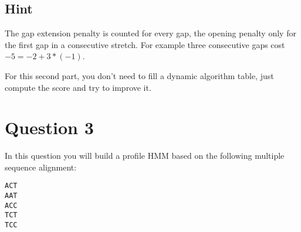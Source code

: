 \documentclass[a4paper,11pt]{article}
\begin{document}
\subsection*{Hint}
The gap extension penalty is counted for every gap, the opening penalty
only for the first gap in a consecutive stretch. For example three
consecutive gaps cost $-5=-2+3*(-1)$.

For this second part, you don't need to fill a dynamic algorithm
table, just compute the score and try to improve it.


\section*{Question 3}

In this question you will build a profile HMM based on the following multiple
sequence alignment:
\begin{verbatim}
ACT
AAT
ACC
TCT
TCC
\end{verbatim}
\end{document}
